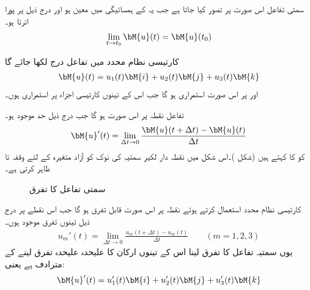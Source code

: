 سمتی تفاعل  اس صورت  پر  تصور کیا جاتا ہے جب یہ  کے ہمسائیگی میں معین ہو اور درج ذیل پر پورا اترتا ہو۔
\begin{align}
\lim_{t\to t_0} \bM{u}(t)=\bM{u}(t_0)
\end{align}

کارتیسی نظام محدد میں تفاعل  درج لکھا جائے گا
\begin{align}
\bM{u}(t)=u_1(t)\bM{i}+u_2(t)\bM{j}+u_3(t)\bM{k}
\end{align}
اور  پر  اس صورت استمراری ہو گا جب اس کے تینوں کارتیسی اجزاء  پر استمراری ہوں۔

تفاعل  نقطہ  پر اس صورت  ہو گا جب  درج ذیل حد موجود ہو۔
\begin{align}
\bM{u}'(t)=\lim_{\Delta t\to 0} \frac{\bM{u}(t+\Delta t)-\bM{u}(t)}{\Delta t}
\end{align}
 کو  کا  کہتے ہیں (شکل )۔اس شکل  میں نقطہ دار لکیر سمتیہ  کی نوک کو  آزاد متغیرہ  کے لئے وقفہ     تا  ظاہر کرتی ہے۔
\begin{figure}
\centering
{}
\caption{سمتی تفاعل کا تفرق}
\label{شکل_الاحصاء_سمتی_تفاعل_تفرق}
\end{figure}

کارتیسی نظام محدد استعمال کرتے ہوئے نقطہ   پر  اس صورت قابل تفرق ہو گا جب اس نقطے پر درج ذیل تینوں تفرق موجود ہوں۔
\begin{align*}
u_m'(t)=\lim_{\Delta t\to 0}\frac{u_m(t+\Delta t)-u_m(t)}{\Delta t} \quad \quad (m=1,2,3)
\end{align*}
یوں سمتیہ تفاعل کا تفرق لینا اس کے تینوں ارکان کا علیحدہ علیحدہ تفرق لینے کے مترادف ہے یعنی:
\begin{align}
\bM{u}'(t)=u_1'(t)\bM{i}+u_2'(t)\bM{j}+u_3'(t)\bM{k}
\end{align}

